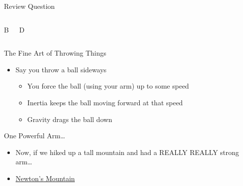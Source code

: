 \documentclass[pdf, aspectratio=169]{beamer}
\begin{document}
\begin{frame}{Review Question}
\begin{columns}
\begin{block}{B}
\begin{center}
			\end{center}
		\end{block}
		\begin{block}{D}
			\begin{center}
			\end{center}
		\end{block}
	\end{columns}
\end{frame}

\begin{frame}{The Fine Art of Throwing Things}
  \begin{itemize}
	\item Say you throw a ball sideways
	  \begin{itemize}
		\item<2-> You force the ball (using your arm) up to some speed
		\item<3-> Inertia keeps the ball moving forward at that speed
		\item<4-> Gravity drags the ball down
	  \end{itemize}
  \end{itemize}
  \begin{center}
  \end{center}
\end{frame}

\begin{frame}{One Powerful Arm\ldots}
  \begin{itemize}
	\item Now, if we hiked up a tall mountain and had a REALLY REALLY strong arm\ldots
	\item \href{http://galileoandeinstein.physics.virginia.edu/more_stuff/flashlets/NewtMtn/home.html}{Newton's Mountain}
  \end{itemize}
\end{frame}
\end{document}
